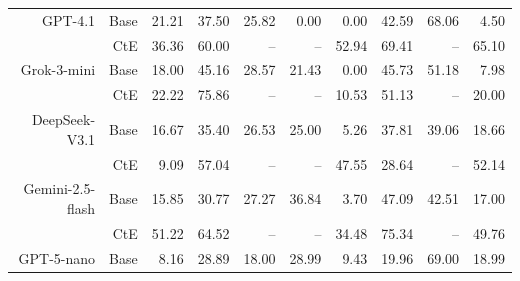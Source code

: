 \begin{table}[!t]
\begin{tabular}{r r !{\color{white!80!black} \vline} r r r r r !{\color{white!80!black} \vline} r r r}
 \sf GPT-4.1 & Base & 21.21 & \textcolor{blue!60!black}{37.50} & \textcolor{blue!60!black}{25.82} & 0.00 & \textcolor{blue!60!black}{0.00} & 42.59 & 68.06 & \textcolor{blue!60!black}{4.50} \\
 & CtE & \textcolor{blue!60!black}{36.36} & \textcolor{blue!60!black}{60.00} & \textcolor{blue!60!black}{--} & \textcolor{blue!60!black}{--} & \textcolor{blue!60!black}{52.94} & \textcolor{blue!60!black}{69.41} & \textcolor{blue!60!black}{--} & \textcolor{blue!60!black}{65.10} \\ \midrule
 \sf Grok-3-mini & Base & \textcolor{blue!60!black}{18.00} & \textcolor{blue!60!black}{45.16} & \textcolor{blue!60!black}{28.57} & \textcolor{blue!60!black}{21.43} & \textcolor{blue!60!black}{0.00} & \textcolor{blue!60!black}{45.73} & \textcolor{blue!60!black}{51.18} & \textcolor{blue!60!black}{7.98} \\
 & CtE & \textcolor{blue!60!black}{22.22} & \textcolor{blue!60!black}{75.86} & \textcolor{blue!60!black}{--} & \textcolor{blue!60!black}{--} & \textcolor{blue!60!black}{10.53} & \textcolor{blue!60!black}{51.13} & \textcolor{blue!60!black}{--} & \textcolor{blue!60!black}{20.00} \\ \midrule
 \sf DeepSeek-V3.1 & Base & \textcolor{blue!60!black}{16.67} & \textcolor{blue!60!black}{35.40} & \textcolor{blue!60!black}{26.53} & \textcolor{blue!60!black}{25.00} & \textcolor{blue!60!black}{5.26} & \textcolor{blue!60!black}{37.81} & \textcolor{blue!60!black}{39.06} & \textcolor{blue!60!black}{18.66} \\
 & CtE & \textcolor{blue!60!black}{9.09} & \textcolor{blue!60!black}{57.04} & \textcolor{blue!60!black}{--} & \textcolor{blue!60!black}{--} & \textcolor{blue!60!black}{47.55} & \textcolor{blue!60!black}{28.64} & \textcolor{blue!60!black}{--} & \textcolor{blue!60!black}{52.14} \\ \midrule
 \sf Gemini-2.5-flash & Base & \textcolor{blue!60!black}{15.85} & \textcolor{blue!60!black}{30.77} & \textcolor{blue!60!black}{27.27} & \textcolor{blue!60!black}{36.84} & \textcolor{blue!60!black}{3.70} & \textcolor{blue!60!black}{47.09} & \textcolor{blue!60!black}{42.51} & \textcolor{blue!60!black}{17.00} \\
 & CtE & \textcolor{blue!60!black}{51.22} & \textcolor{blue!60!black}{64.52} & \textcolor{blue!60!black}{--} & \textcolor{blue!60!black}{--} & \textcolor{blue!60!black}{34.48} & \textcolor{blue!60!black}{75.34} & \textcolor{blue!60!black}{--} & \textcolor{blue!60!black}{49.76} \\ \midrule
 \sf GPT-5-nano & Base & \textcolor{blue!60!black}{8.16} & \textcolor{blue!60!black}{28.89} & \textcolor{blue!60!black}{18.00} & \textcolor{blue!60!black}{28.99} & \textcolor{blue!60!black}{9.43} & \textcolor{blue!60!black}{19.96} & \textcolor{blue!60!black}{69.00} & \textcolor{blue!60!black}{18.99} \\

\end{tabular}
\end{table}
